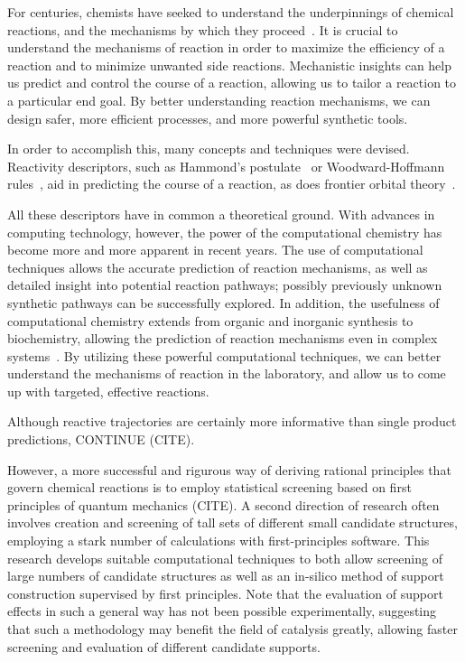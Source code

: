 
For centuries,
chemists have seeked to understand the underpinnings of chemical reactions,
and the mechanisms by which they proceed~\cite{Armstrong_1887}.
It is crucial to understand the mechanisms of reaction in order to maximize the efficiency of a reaction
and to minimize unwanted side reactions.
Mechanistic insights can help us predict and control the course of a reaction,
allowing us to tailor a reaction to a particular end goal.
By better understanding reaction mechanisms,
we can design safer,
more efficient processes,
and more powerful synthetic tools.

In order to accomplish this,
many concepts and techniques were devised.
Reactivity descriptors,
such as
Hammond's postulate~\cite{Hammond_1955,Cremer_2012,HammondPrinciple} or
Woodward-Hoffmann rules~\cite{Havinga_1961,Woodward_1965,Dewar_1966,Zimmerman_1966,Woodward_1969,Nobel_1981},
aid in predicting the course of a reaction,
as does frontier orbital theory~\cite{Fukui_1952,Brown_2013}.

All these descriptors have in common a theoretical ground.
With advances in computing technology,
however,
the power of the computational chemistry has become more and more apparent in recent years.
The use of computational techniques allows the accurate prediction of reaction mechanisms,
as well as detailed insight into potential reaction pathways;
possibly previously unknown synthetic pathways can be successfully explored.
In addition,
the usefulness of computational chemistry extends from organic and inorganic synthesis to biochemistry,
allowing the prediction of reaction mechanisms even in complex systems~\cite{Klippenstein_2014}.
By utilizing these powerful computational techniques,
we can better understand the mechanisms of reaction in the laboratory,
and allow us to come up with targeted,
effective reactions.

Although reactive trajectories are certainly more informative than single product predictions,
CONTINUE (CITE).

However,
a more successful and rigurous way of deriving rational principles that govern
chemical reactions is to employ statistical screening based on first principles
of quantum mechanics (CITE).
A second direction of research often involves creation and screening of
tall sets of different small candidate structures,
employing a stark number of calculations with first-principles software.
This research develops suitable computational techniques
to both allow screening of large numbers of candidate structures as well as
an in-silico method of support construction supervised by first principles.
Note that the evaluation of support effects in such a general way
has not been possible experimentally,
suggesting that such a methodology may benefit the field of catalysis greatly,
allowing faster screening and evaluation of
different candidate supports.

